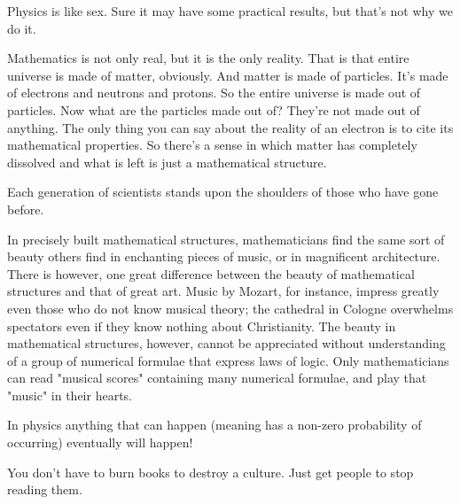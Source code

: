	\begin{fuquote}Physics is like sex. Sure it may have some practical results, but that's not why we do it.
 	\end{fuquote}
 	
	\begin{fuquote}Mathematics is not only real, but it is the only reality. That is that entire universe is made of matter, obviously. And matter is made of particles. It's made of electrons and neutrons and protons. So the entire universe is made out of particles. Now what are the particles made out of? They're not made out of anything. The only thing you can say about the reality of an electron is to cite its mathematical properties. So there's a sense in which matter has completely dissolved and what is left is just a mathematical structure.
 	\end{fuquote}
 	
 	\begin{fuquote}Each generation of scientists stands upon the shoulders of those who have gone before.
 	\end{fuquote}
 	
 	\begin{fuquote}In precisely built mathematical structures, mathematicians find the same sort of beauty others find in enchanting pieces of music, or in magnificent architecture. There is however, one great difference between the beauty of mathematical structures and that of great art. Music by Mozart, for instance, impress greatly even those who do not know musical theory; the cathedral in Cologne overwhelms spectators even if they know nothing about Christianity. The beauty in mathematical structures, however, cannot be appreciated without understanding of a group of numerical formulae that express laws of logic. Only mathematicians can read "musical scores" containing many numerical formulae, and play that "music" in their hearts.
 	\end{fuquote}
 	
 	\begin{fuquote}[?]In physics anything that can happen (meaning has a non-zero probability of occurring) eventually will happen!
 	\end{fuquote}
 	
 	\begin{fuquote}You don't have to burn books to destroy a culture. Just get people to stop reading them.
 	\end{fuquote}
 	
